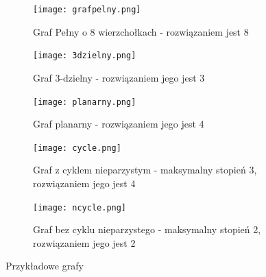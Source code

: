 \begin{figure}
    \begin{subfigure}[t]{0.4\textwidth}
      \texttt{[image: grafpelny.png]}
      \caption{Graf Pełny o 8 wierzchołkach - rozwiązaniem jest 8}
    \end{subfigure}
    \hfill
    \begin{subfigure}[t]{0.4\textwidth}
      \texttt{[image: 3dzielny.png]}
      \caption{Graf 3-dzielny - rozwiązaniem jego jest 3}
    \end{subfigure}
    \begin{subfigure}[t]{0.3\textwidth}
        \texttt{[image: planarny.png]}
        \caption{Graf planarny - rozwiązaniem jego jest 4}
    \end{subfigure}
    \hfill
    \begin{subfigure}[t]{0.3\textwidth}
        \texttt{[image: cycle.png]}
        \caption{Graf z cyklem nieparzystym - maksymalny stopień 3, rozwiązaniem jego jest 4}
    \end{subfigure}
    \hfill
    \begin{subfigure}[t]{0.3\textwidth}
        \texttt{[image: ncycle.png]}
        \caption{Graf bez cyklu nieparzystego - maksymalny stopień 2, rozwiązaniem jego jest 2}
    \end{subfigure}
    \caption{Przykładowe grafy}
    \label{Przyklady}
\end{figure}

